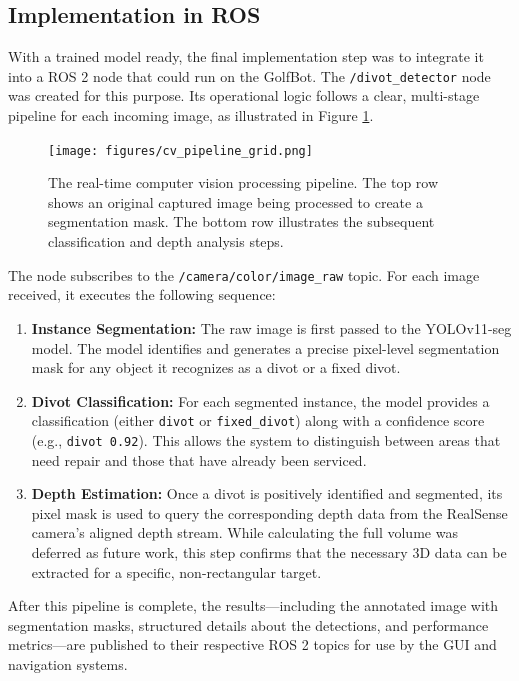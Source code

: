 \subsection{Implementation in ROS}
\label{ssec:cv_ros_implementation}
With a trained model ready, the final implementation step was to integrate it into a ROS 2 node that could run on the GolfBot. The \texttt{/divot\_detector} node was created for this purpose. Its operational logic follows a clear, multi-stage pipeline for each incoming image, as illustrated in Figure \ref{fig:cv_processing_pipeline}.

\begin{figure}[h!]
    \centering
    \texttt{[image: figures/cv\_pipeline\_grid.png]}
    \caption{The real-time computer vision processing pipeline. The top row shows an original captured image being processed to create a segmentation mask. The bottom row illustrates the subsequent classification and depth analysis steps.}
    \label{fig:cv_processing_pipeline}
\end{figure}

The node subscribes to the \texttt{/camera/color/image\_raw} topic. For each image received, it executes the following sequence:

\begin{enumerate}
    \item \textbf{Instance Segmentation:} The raw image is first passed to the YOLOv11-seg model. The model identifies and generates a precise pixel-level segmentation mask for any object it recognizes as a divot or a fixed divot.

    \item \textbf{Divot Classification:} For each segmented instance, the model provides a classification (either \texttt{divot} or \texttt{fixed\_divot}) along with a confidence score (e.g., \texttt{divot 0.92}). This allows the system to distinguish between areas that need repair and those that have already been serviced.

    \item \textbf{Depth Estimation:} Once a divot is positively identified and segmented, its pixel mask is used to query the corresponding depth data from the RealSense camera's aligned depth stream. While calculating the full volume was deferred as future work, this step confirms that the necessary 3D data can be extracted for a specific, non-rectangular target.
\end{enumerate}

After this pipeline is complete, the results—including the annotated image with segmentation masks, structured details about the detections, and performance metrics—are published to their respective ROS 2 topics for use by the GUI and navigation systems.

